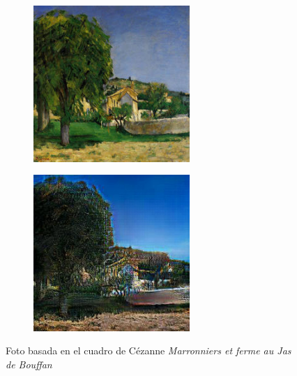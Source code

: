 \documentclass[[../main.tex]{subfiles}
\begin{document}
\begin{figure}[!htb]
            \begin{subfigure}[b]{0.49\textwidth}
            \includegraphics[width=0.65\textwidth]{imagenes/cuadro2imagen/cezanne/00110.jpg}
            \end{subfigure}
        \hfill
            \begin{subfigure}[b]{0.49\textwidth}
            \includegraphics[width=0.65\textwidth]{imagenes/cuadro2imagen/cezanne/00110_2.jpg}
            \end{subfigure}
        \caption{Foto basada en el cuadro de Cézanne \textit{Marronniers et ferme au Jas de Bouffan}}
        \label{fig:cezanne_foto_bouffan}
        \end{figure}
        
\end{document}
